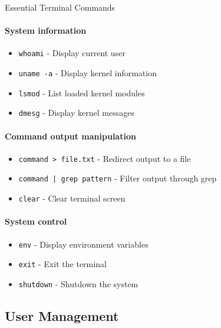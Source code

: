 \begin{KR}{Essential Terminal Commands}\\
    \paragraph{System information}
    \begin{itemize}
        \item \texttt{whoami} - Display current user
        \item \texttt{uname -a} - Display kernel information
        \item \texttt{lsmod} - List loaded kernel modules
        \item \texttt{dmesg} - Display kernel messages
    \end{itemize}
    
    \paragraph{Command output manipulation}
    \begin{itemize}
        \item \texttt{command > file.txt} - Redirect output to a file
        \item \texttt{command | grep pattern} - Filter output through grep
        \item \texttt{clear} - Clear terminal screen
    \end{itemize}
    
    \paragraph{System control}
    \begin{itemize}
        \item \texttt{env} - Display environment variables
        \item \texttt{exit} - Exit the terminal
        \item \texttt{shutdown} - Shutdown the system
    \end{itemize}
\end{KR}

\subsection{User Management}

